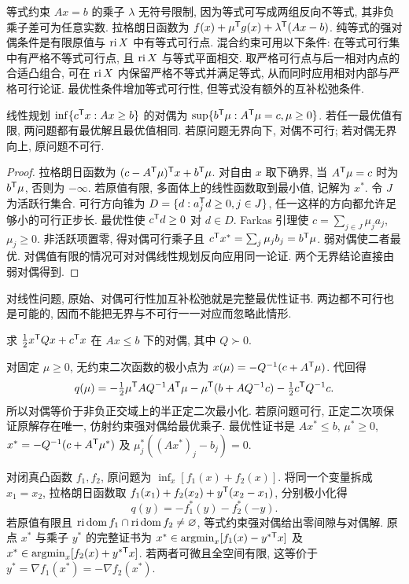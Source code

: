 等式约束 $Ax=b$ 的乘子 $\lambda$ 无符号限制, 因为等式可写成两组反向不等式, 其非负乘子差可为任意实数. 拉格朗日函数为 $f(x)+\mu^{\mathsf T} g(x)+\lambda^{\mathsf T}(Ax-b)$. 纯等式的强对偶条件是有限原值与 $\operatorname{ri} X$ 中有等式可行点. 混合约束可用以下条件: 在等式可行集中有严格不等式可行点, 且 $\operatorname{ri} X$ 与等式平面相交. 取严格可行点与后一相对内点的合适凸组合, 可在 $\operatorname{ri} X$ 内保留严格不等式并满足等式, 从而同时应用相对内部与严格可行论证. 最优性条件增加等式可行性, 但等式没有额外的互补松弛条件.

\begin{theorem}\label{thm:lpdual}
线性规划 $\inf\{c^{\mathsf T} x:Ax\ge b\}$ 的对偶为 $\sup\{b^{\mathsf T}\mu:A^{\mathsf T}\mu=c,\mu\ge0\}$. 若任一最优值有限, 两问题都有最优解且最优值相同. 若原问题无界向下, 对偶不可行; 若对偶无界向上, 原问题不可行.
\end{theorem}
\begin{proof}
拉格朗日函数为 $(c-A^{\mathsf T}\mu)^{\mathsf T} x+b^{\mathsf T}\mu$. 对自由 $x$ 取下确界, 当 $A^{\mathsf T}\mu=c$ 时为 $b^{\mathsf T}\mu$, 否则为 $-\infty$. 若原值有限, 多面体上的线性函数取到最小值, 记解为 $x^*$. 令 $J$ 为活跃行集合. 可行方向锥为 $D=\{d:a_j^{\mathsf T} d\ge0,j\in J\}$, 任一这样的方向都允许足够小的可行正步长. 最优性使 $c^{\mathsf T} d\ge0$ 对 $d\in D$. Farkas 引理使 $c=\sum_{j\in J}\mu_j a_j$, $\mu_j\ge0$. 非活跃项置零, 得对偶可行乘子且 $c^{\mathsf T} x^*=\sum_j\mu_jb_j=b^{\mathsf T}\mu$. 弱对偶使二者最优. 对偶值有限的情况可对对偶线性规划反向应用同一论证. 两个无界结论直接由弱对偶得到.
\end{proof}
对线性问题, 原始、对偶可行性加互补松弛就是完整最优性证书. 两边都不可行也是可能的, 因而不能把无界与不可行一一对应而忽略此情形.

\begin{example}
求 $\tfrac12x^{\mathsf T} Qx+c^{\mathsf T} x$ 在 $Ax\le b$ 下的对偶, 其中 $Q\succ0$.
\end{example}
\begin{solution}
对固定 $\mu\ge0$, 无约束二次函数的极小点为 $x(\mu)=-Q^{-1}(c+A^{\mathsf T}\mu)$. 代回得
\[
q(\mu)=-\tfrac12\mu^{\mathsf T} AQ^{-1}A^{\mathsf T}\mu-\mu^{\mathsf T}(b+AQ^{-1}c)-\tfrac12c^{\mathsf T} Q^{-1}c.
\]
所以对偶等价于非负正交域上的半正定二次最小化. 若原问题可行, 正定二次项保证原解存在唯一, 仿射约束强对偶给最优乘子. 最优性证书是 $Ax^*\le b$, $\mu^*\ge0$, $x^*=-Q^{-1}(c+A^{\mathsf T}\mu^*)$ 及 $\mu_j^*((Ax^*)_j-b_j)=0$.
\end{solution}

对闭真凸函数 $f_1,f_2$, 原问题为 $\inf_x[f_1(x)+f_2(x)]$. 将同一个变量拆成 $x_1=x_2$, 拉格朗日函数取 $f_1(x_1)+f_2(x_2)+y^{\mathsf T}(x_2-x_1)$, 分别极小化得
\[
q(y)=-f_1^*(y)-f_2^*(-y).
\]
若原值有限且 $\operatorname{ri}\operatorname{dom} f_1\cap\operatorname{ri}\operatorname{dom} f_2\ne\varnothing$, 等式约束强对偶给出零间隙与对偶解. 原点 $x^*$ 与乘子 $y^*$ 的完整证书为
$x^*\in\operatorname{argmin}_x[f_1(x)-y^{*\mathsf T}x]$ 及 $x^*\in\operatorname{argmin}_x[f_2(x)+y^{*\mathsf T}x]$. 若两者可微且全空间有限, 这等价于 $y^*=\nabla f_1(x^*)=-\nabla f_2(x^*)$.

